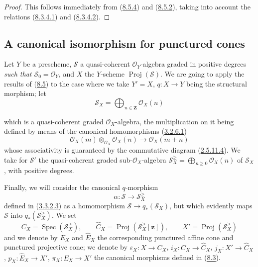 \begin{proof}
This follows immediately from (\hyperref[II.8.5.4]{8.5.4}) and
(\hyperref[II.8.5.2]{8.5.2}), taking into account the relations
(\hyperref[II.8.3.4.1]{8.3.4.1}) and
(\hyperref[II.8.3.4.2]{8.3.4.2}).
\end{proof}

\subsection{A canonical isomorphism for punctured cones}
\label{subsection:II.8.6}

\begin{env}[8.6.1]
\label{II.8.6.1}
Let $Y$ be a prescheme, $\mathcal{S}$ a quasi-coherent $\mathcal{O}_Y$-algebra
graded in positive degrees \emph{such that
$\mathcal{S}_0=\mathcal{O}_Y$}, and $X$ the $Y$-scheme
$\operatorname{Proj}(\mathcal{S})$. We are going to apply the results of
(\hyperref[subsection:II.8.5]{8.5}) to the case where we take $Y'=X$,
$q:X\to Y$ being the structural morphism; let
\begin{equation}
\label{II.8.6.1.1}
  \mathcal{S}_X=\bigoplus_{n\in\mathbf{Z}}\mathcal{O}_X(n)
\tag{8.6.1.1}
\end{equation}

which is a quasi-coherent graded $\mathcal{O}_X$-algebra, the multiplication
on it being defined by means of the canonical homomorphisms
(\hyperref[II.3.2.6.1]{3.2.6.1})
\[
  \mathcal{O}_X(m)\otimes_{\mathcal{O}_X}\mathcal{O}_X(n)
  \to\mathcal{O}_X(m+n)
\]
whose associativity is guaranteed by the commutative diagram
(\hyperref[II.2.5.11.4]{2.5.11.4}). We take for $\mathcal{S}'$ the
quasi-coherent graded sub-$\mathcal{O}_X$-algebra
$\mathcal{S}_X^{\geq}=\bigoplus_{n\geq0}\mathcal{O}_X(n)$ of
$\mathcal{S}_X$, with positive degrees.

Finally, we will consider the canonical $q$-morphism
\begin{equation}
\label{II.8.6.1.2}
  \alpha:\mathcal{S}\to\mathcal{S}_X^{\geq}
\tag{8.6.1.2}
\end{equation}
defined in (\hyperref[II.3.3.2.3]{3.3.2.3}) as a homomorphism
$\mathcal{S}\to q_*(\mathcal{S}_X)$, but which evidently maps
$\mathcal{S}$ into $q_*(\mathcal{S}_X^{\geq})$. We set
\begin{equation}
\label{II.8.6.1.3}
  C_X=\operatorname{Spec}(\mathcal{S}_X^{\geq}),\qquad
  \widehat{C}_X=\operatorname{Proj}(\mathcal{S}_X^{\geq}[\mathbf{z}]),\qquad
  X'=\operatorname{Proj}(\mathcal{S}_X^{\geq})
\tag{8.6.1.3}
\end{equation}
and we denote by $E_X$ and $\widehat{E}_X$ the corresponding punctured affine
cone and punctured projective cone; we denote by
$\varepsilon_X:X\to C_X$, $i_X:C_X\to\widehat{C}_X$,
$j_X:X'\to\widehat{C}_X$, $p_X:\widehat{E}_X\to X'$,
$\pi_X:E_X\to X'$ the canonical morphisms defined in
(\hyperref[subsection:II.8.3]{8.3}).
\end{env}

